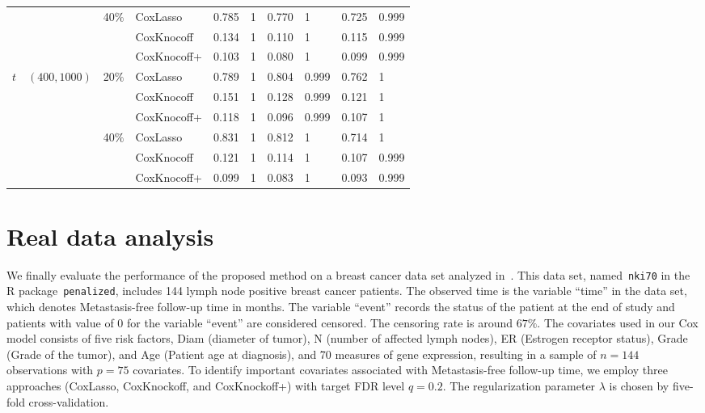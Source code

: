 \documentclass[11pt]{article}
\begin{document}
\begin{center}
\begin{table*}[h!]
{\begin{tabular}{llll cl cl cl}
			&             & 40$\%$  & CoxLasso    & 0.785  & 1    & 0.770  & 1  & 0.725   & 0.999 \\
			&             &         & CoxKnocoff  & 0.134  & 1    & 0.110  & 1  & 0.115   & 0.999 \\
			&             &         & CoxKnocoff+ & 0.103  & 1    & 0.080  & 1  & 0.099   & 0.999 \\
			\midrule
			$t$   & $(400,1000)$ & 20$\%$ & CoxLasso    & 0.789  & 1   & 0.804   & 0.999  & 0.762   & 1  \\
			&             &         & CoxKnocoff  & 0.151  & 1   & 0.128   & 0.999  & 0.121   & 1 \\
			&             &         & CoxKnocoff+ & 0.118  & 1   & 0.096   & 0.999  & 0.107   & 1 \\
			&             & 40$\%$  & CoxLasso    & 0.831  & 1   & 0.812   & 1      & 0.714   & 1 \\
			&             &         & CoxKnocoff  & 0.121  & 1   & 0.114   & 1      & 0.107   & 0.999 \\
			&             &         & CoxKnocoff+ & 0.099  & 1   & 0.083   & 1      & 0.093   & 0.999 \\ 			
			\bottomrule
		\end{tabular}}
	\end{table*}
\end{center}



\section{Real data analysis}\label{sec: RealDataAnalysis}


We finally evaluate the performance of the proposed method on a breast cancer data set 
analyzed in~\cite{van2002gene}. This data set, named~\texttt{nki70} in the R package~\texttt{penalized}, 
includes 144 lymph node positive breast cancer patients.
The observed time is the variable ``time'' in the data set, which denotes Metastasis-free follow-up time in months. The variable ``event'' records 
the status of the patient at the end of study and patients with value of $0$ for the variable ``event'' are considered censored.
The censoring rate is around $67\%$. 
The covariates used in our Cox model consists of five risk factors, Diam (diameter of tumor), N (number of affected lymph nodes), ER (Estrogen receptor status), Grade (Grade of the tumor), and Age (Patient age at diagnosis), 
and 70 measures of gene expression, resulting in a sample of $n=144$ observations with $p=75$ covariates. 
To identify important covariates associated with Metastasis-free follow-up time, we employ three approaches (CoxLasso, CoxKnockoff, and CoxKnockoff+) with target FDR level $q = 0.2$.
The regularization parameter $\lambda$ 
is chosen by five-fold cross-validation.
\end{document}
